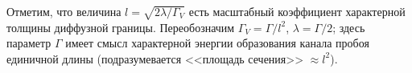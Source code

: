 Отметим, что величина $l = \sqrt{2 \lambda / \Gamma_V}$ есть масштабный коэффициент характерной толщины диффузной границы. Переобозначим $\Gamma_V = \Gamma / l^2$, $\lambda = \Gamma / 2 $; здесь параметр $\Gamma$ имеет смысл характерной энергии образования канала пробоя единичной длины (подразумевается <<площадь сечения>> $\approx l^2$).
